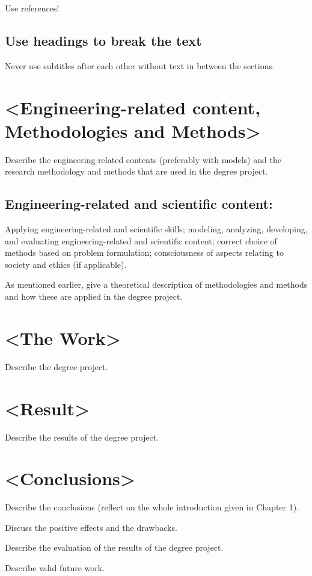 Use references!

\subsection{Use headings to break the text}
Never use subtitles after each other without text in between the sections.

\newpage
\section{<Engineering-related content, Methodologies and Methods>}
Describe the engineering-related contents (preferably with models) and the research methodology and methods that are used in the degree project. 

\subsection{Engineering-related and scientific content:}
Applying engineering-related and scientific skills; modeling, analyzing, developing, and evaluating engineering-related and scientific content; correct choice of methods based on problem formulation; consciousness of aspects relating to society and ethics (if applicable).

As mentioned earlier, give a theoretical description of methodologies and methods and how these are applied in the degree project.

\newpage
\section{<The Work> }
Describe the degree project.

\newpage
\section{<Result> }
Describe the results of the degree project.

\newpage
\section{<Conclusions> }
Describe the conclusions (reflect on the whole introduction given in Chapter 1). 

Discuss the positive effects and the drawbacks. 

Describe the evaluation of the results of the degree project.

Describe valid future work.  










